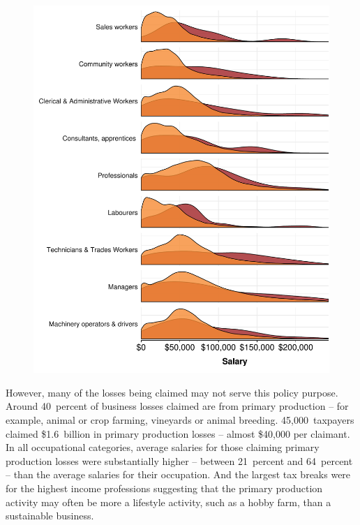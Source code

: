 \documentclass{grattan}\usepackage[]{graphicx}\usepackage[]{color}
\begin{document}
\begin{figure}
\includegraphics[width=\columnwidth]{CGT-NG-atlas//density-salary-by-PP-losses-1}
\end{figure}

However, many of the losses being claimed may not serve this policy purpose. Around 40~percent of business losses claimed are from primary production -- for example, animal or crop farming, vineyards or animal breeding. 45,000~taxpayers claimed \$1.6~billion  in primary production losses -- almost \$40,000 per claimant. In all occupational categories, average salaries for those claiming primary production losses were substantially higher -- between 21~percent and 64~percent -- than the average salaries for their occupation. And the largest tax breaks were for the highest income professions  suggesting that the primary production activity may often be more a lifestyle activity, such as a hobby farm, than a sustainable business. 
\end{document}
